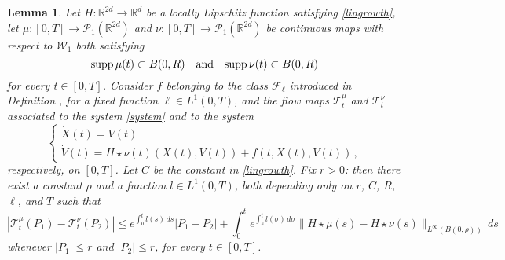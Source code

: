 \documentclass[11pt]{article}
\theoremstyle{plain}
\newtheorem{lemma}[theorem]{Lemma}
\theoremstyle{definition}
\theoremstyle{remark}
\numberwithin{equation}{section}
\newcommand{\R}{{\mathbb R}}
\newcommand{\PP}{{\mathcal P}_1}
\newcommand{\WW}{{\mathcal W}_1}
\begin{document}
\begin{lemma}
Let $H\colon \R^{2d} \to \R^{d}$ be a locally Lipschitz function satisfying \eqref{lingrowth}, let $\mu\colon[0,T]\to \PP(\R^{2d})$ and $\nu\colon[0,T]\to \PP(\R^{2d})$ be continuous maps with respect to $\WW$ both satisfying 
\begin{equation}\label{hypo2+}
{\rm supp }\,\mu(t)\subset B(0,R)\quad\hbox{and}\quad {\rm supp }\,\nu(t)\subset B(0,R)
\end{equation}
for every $t \in [0, T]$.
Consider $f$ belonging to the class ${\mathcal F}_\ell$ introduced in Definition \label{class}, for a fixed function $\ell \in L^1(0,T)$, and the flow maps ${\mathcal T}^\mu_t$ and ${\mathcal T}^\nu_t$ associated to the system \eqref{system} and to the system
\begin{equation}\label{system+}
\begin{cases}
\dot X(t)=V(t)\\
\dot V(t)= H\star \nu(t) (X(t), V(t))+ f(t, X(t), V(t))\,,
\end{cases}
\end{equation}
respectively, on $[0, T]$. Let $C$ be the constant in \eqref{lingrowth}. Fix $r>0$: then there exist a constant $\rho$ and a function $l\in L^1(0,T)$, both depending only on $r$, $C$, $R$,  $\ell$, and $T$ such that
\begin{equation}\label{contflow}
|{\mathcal T}^\mu_t(P_1)-{\mathcal T}^\nu_t(P_2)|\le e^{\int_0^t l(s)\,ds}|P_1-P_2|+ \int_0^t e^{\int_s^t l(\sigma)\,d\sigma}\|H\star \mu(s)-H\star \nu(s)\|_{L^\infty(B(0,\rho))}\,ds
\end{equation}
whenever $|P_1|\le r$ and $|P_2|\le r$, for every $t \in [0, T]$.
\end{lemma}
\end{document}
